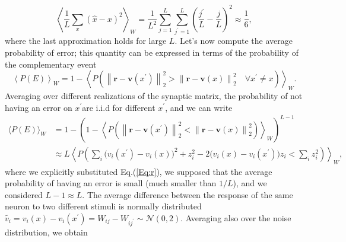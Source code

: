 \documentclass[a4paper]{article}%
\begin{document}
\begin{equation}
\left\langle \frac{1}{L}\sum_{x} (\hat{x}-x)^{2}\right\rangle _{W} =\frac
{1}{L^{2}}\sum_{j=1}^{L} \sum_{j^{\prime}=1}^{L} \left( \frac{j^{\prime}}
{L}-\frac{j}{L}\right) ^{2} \approx\frac{1}{6},
\end{equation}
where the last approximation holds for large $L$. 
Let's now compute the average probability of
error; this quantity can be expressed in terms of the probability of the complementary event
\begin{equation}
\left\langle P(E)\right\rangle_{W} = 1 - \left\langle P\left(\left\|
\mathbf{r}-\mathbf{v}(x^{\prime})\right\| _{2}^{2} >\left\|  \mathbf{r}
-\mathbf{v}(x)\right\| _{2}^{2} \quad\forall x^{\prime}\neq
x\right) \right\rangle _{W}.
\end{equation}
Averaging over different realizations of the synaptic matrix, the probability
of not having an error on $x^{\prime}$are i.i.d for different $x^{\prime}$,
and we can write
\begin{equation}
\begin{split}
\langle P(E)\rangle_{W}  & = 1 - \left( 1 - \left\langle P\left(
\left\|  \mathbf{r}-\mathbf{v}(x^{\prime})\right\| _{2}^{2} < \left\|
\mathbf{r}-\mathbf{v}(x)\right\| _{2}^{2} \right) \right\rangle _{W}\right)
^{L-1}\\
&  \approx L \left\langle P\left(\sum_{i} \big(v_{i}(x^{\prime}) -v_{i}
(x)\big)^{2} + z_{i}^{2} - 2\big(v_{i}(x)-v_{i}(x^{\prime})\big)z_{i} <
\sum_{i} z_{i}^{2} \right) \right\rangle _{W},
\end{split}
\end{equation}
where we explicitly substituted Eq.(\ref{Eq:r}), we supposed that the average
probability of having an error is small (much smaller than $1/L$), and
we considered $L-1 \approx L$.  The average difference between the response of the same neuron to two
different stimuli is normally distributed $\tilde{v_{i}} = v_{i}(x)-v_{i}(x^{\prime}) = W_{ij}
-W_{ij^{\prime}} \sim \mathcal{N}(0,2)$.
Averaging also over the noise distribution, we obtain
\end{document}
